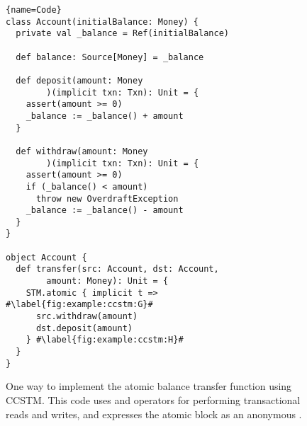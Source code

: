 \begin{figure}
\begin{lstlisting}{name=Code}
class Account(initialBalance: Money) {
  private val _balance = Ref(initialBalance)

  def balance: Source[Money] = _balance

  def deposit(amount: Money
        )(implicit txn: Txn): Unit = {
    assert(amount >= 0)
    _balance := _balance() + amount
  }

  def withdraw(amount: Money
        )(implicit txn: Txn): Unit = {
    assert(amount >= 0)
    if (_balance() < amount)
      throw new OverdraftException
    _balance := _balance() - amount
  }
}

object Account {
  def transfer(src: Account, dst: Account,
        amount: Money): Unit = {
    STM.atomic { implicit t => #\label{fig:example:ccstm:G}#
      src.withdraw(amount)
      dst.deposit(amount)
    } #\label{fig:example:ccstm:H}#
  }
}
\end{lstlisting}

\caption{One way to implement the atomic balance transfer function
using CCSTM.  This code uses  and \code{:=} operators
for performing transactional reads and writes, and expresses the atomic
block as an anonymous .}

\label{fig:example:ccstm}
\end{figure}
